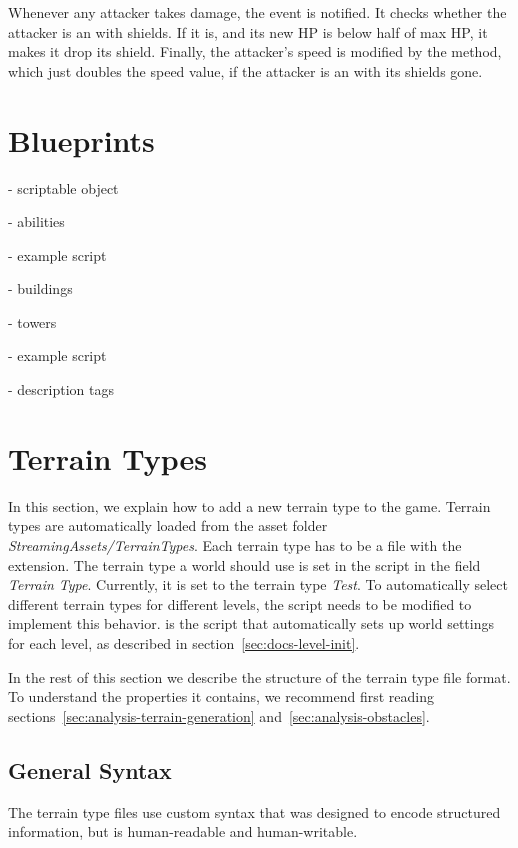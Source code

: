 Whenever any attacker takes damage, the  event is notified.
It checks whether the attacker is an  with shields.
If it is, and its new HP is below half of max HP, it makes it drop its shield.
Finally, the attacker's speed is modified by the  method, which just doubles the speed value, if the attacker is an  with its shields gone.

\section{Blueprints}

- scriptable object

- abilities

- example script

- buildings

- towers

- example script

- description tags

\section{Terrain Types}\label{sec:docs-terrain-type}

In this section, we explain how to add a new terrain type to the game.
Terrain types are automatically loaded from the asset folder \emph{StreamingAssets/TerrainTypes}.
Each terrain type has to be a file with the  extension.
The terrain type a world should use is set in the  script in the field \emph{Terrain Type}.
Currently, it is set to the terrain type \emph{Test}.
To automatically select different terrain types for different levels, the  script needs to be modified to implement this behavior.
 is the script that automatically sets up world settings for each level, as described in section~\ref{sec:docs-level-init}.

In the rest of this section we describe the structure of the terrain type file format.
To understand the properties it contains, we recommend first reading sections~\ref{sec:analysis-terrain-generation} and~\ref{sec:analysis-obstacles}.

\subsection{General Syntax}

The terrain type files use custom syntax that was designed to encode structured information, but is human-readable and human-writable.

